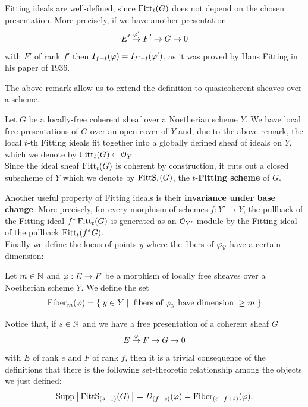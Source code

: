 	\begin{rema}
	Fitting ideals are well-defined, since $\operatorname{Fitt}_t(G)$ does not depend on the chosen presentation. More precisely, if we have another presentation
			$$ E' \overset{\varphi'}\to F' \to G \to 0 $$
			with $F'$ of rank $f'$ then $I_{f-t}(\varphi) = I_{f'-t}(\varphi') $, as it was proved by Hans Fitting in his paper \cite{FITT} of 1936.
	\end{rema}
	The above remark allow us to extend the definition to quasicoherent sheaves over a scheme.
	\begin{defi}
		Let ${G}$ be a locally-free coherent sheaf over a Noetherian scheme $Y$. We have local free presentations of ${G}$ over an open cover of $Y$ and, due to the above remark, the local $t$-th Fitting ideals fit together into a globally defined sheaf of ideals on $Y$, which we denote by $\operatorname{Fitt}_t({G}) \subset \mathcal{O}_Y$.\\
		Since the ideal sheaf $\operatorname{Fitt}_t({G})$ is coherent by construction, it cuts out a closed subscheme of $Y$ which we denote by $ \operatorname{FittS}_t({G}) $, the $t$-\textbf{Fitting scheme} of ${G}$.
	\end{defi}
	Another useful property of Fitting ideals is their \textbf{invariance under base change}. More precisely, for every morphism of schemes $f:Y'\to Y$, the pullback of the Fitting ideal $f^*\operatorname{Fitt}_t({G})$ is generated as an $\mathcal{O}_{Y'}$-module by the Fitting ideal of the pullback $\operatorname{Fitt}_t(f^*{G})$.\\
	
	Finally we define the locus of points $y$ where the fibers of $\varphi_y$ have a certain dimension:
	\begin{defi}
		Let $m\in \mathbb{N}$ and $\varphi:E\to F$ be a morphism of locally free sheaves over a Noetherian scheme $Y$. We define the set
		$$ \operatorname{Fiber}_m (\varphi) = \left\{\;  y\in Y \mid \text{ fibers of } \varphi_y \text{ have dimension } \geq m  \; \right\} $$
	\end{defi}
	Notice that, if $s\in \mathbb{N}$ and we have a free presentation of a coherent sheaf $G$
	$$ E\overset{\varphi}\to F \to G\to 0 $$
	with $E$ of rank $e$ and $F$ of rank $f$, then it is a trivial consequence of the definitions that there is the following set-theoretic relationship among the objects we just defined:
	\begin{equation}\label{eq:degeneracy}
		\operatorname{Supp}\left[\,\operatorname{FittS}_{(s-1)}(G)\,\right] = D_{(f-s)}(\varphi) = \operatorname{Fiber}_{(e-f+s)}(\varphi).
	\end{equation}
	

